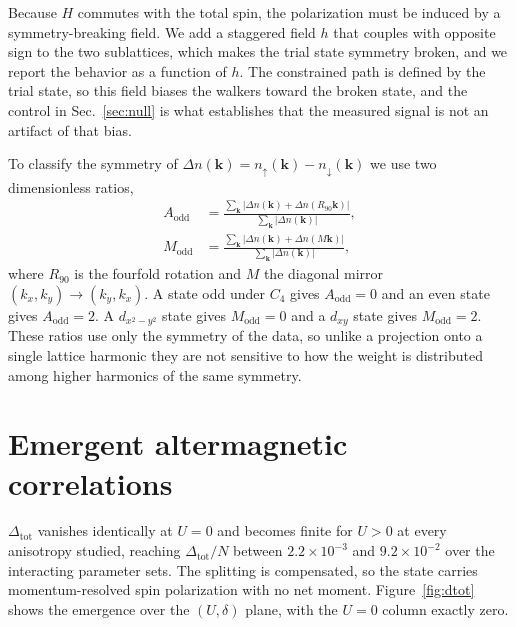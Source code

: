 \documentclass[aps,prb,reprint,superscriptaddress,amsmath,amssymb,floatfix]{revtex4-2}
\begin{document}
Because $H$ commutes with the total spin, the polarization must be induced by a
symmetry-breaking field. We add a staggered field $h$ that couples with opposite
sign to the two sublattices, which makes the trial state symmetry broken, and we
report the behavior as a function of $h$. The constrained path is defined by the
trial state, so this field biases the walkers toward the broken state, and the
control in Sec.~\ref{sec:null} is what establishes that the measured signal is
not an artifact of that bias.

To classify the symmetry of
$\Delta n(\bm{k}) = n_{\uparrow}(\bm{k}) - n_{\downarrow}(\bm{k})$ we use two
dimensionless ratios,
\begin{align}
A_{\mathrm{odd}} &= \frac{\sum_{\bm{k}} \left| \Delta n(\bm{k}) + \Delta n(R_{90}\bm{k}) \right|}
                         {\sum_{\bm{k}} \left| \Delta n(\bm{k}) \right|},
\label{eq:aodd}\\
M_{\mathrm{odd}} &= \frac{\sum_{\bm{k}} \left| \Delta n(\bm{k}) + \Delta n(M\bm{k}) \right|}
                         {\sum_{\bm{k}} \left| \Delta n(\bm{k}) \right|},
\label{eq:modd}
\end{align}
where $R_{90}$ is the fourfold rotation and $M$ the diagonal mirror
$(k_x,k_y) \to (k_y,k_x)$. A state odd under $C_4$ gives $A_{\mathrm{odd}} = 0$
and an even state gives $A_{\mathrm{odd}} = 2$. A $d_{x^2-y^2}$ state gives
$M_{\mathrm{odd}} = 0$ and a $d_{xy}$ state gives $M_{\mathrm{odd}} = 2$. These
ratios use only the symmetry of the data, so unlike a projection onto a single
lattice harmonic they are not sensitive to how the weight is distributed among
higher harmonics of the same symmetry.

\section{Emergent altermagnetic correlations}
\label{sec:order}

$\Delta_{\mathrm{tot}}$ vanishes identically at $U = 0$ and becomes finite for
$U > 0$ at every anisotropy studied, reaching $\Delta_{\mathrm{tot}}/N$ between
$2.2\times10^{-3}$ and $9.2\times10^{-2}$ over the interacting parameter sets.
The splitting is compensated, so the state carries momentum-resolved spin
polarization with no net moment. Figure~\ref{fig:dtot} shows the emergence over
the $(U,\delta)$ plane, with the $U = 0$ column exactly zero.
\end{document}
